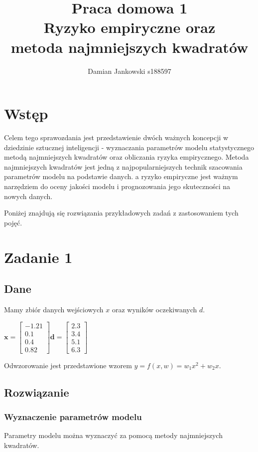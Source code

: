\documentclass{article}
\title{Praca domowa 1\\Ryzyko empiryczne oraz \\
metoda najmniejszych kwadratów}
\author{Damian Jankowski s188597}
\begin{document}
\maketitle

\section{Wstęp}
Celem tego sprawozdania jest przedstawienie dwóch ważnych 
koncepcji w dziedzinie sztucznej inteligencji - 
wyznaczania parametrów modelu statystycznego metodą 
najmniejszych kwadratów oraz obliczania ryzyka empirycznego. 
Metoda najmniejszych kwadratów jest jedną z najpopularniejszych 
technik szacowania parametrów modelu na podstawie danych. a 
ryzyko empiryczne jest ważnym narzędziem do oceny jakości 
modelu i prognozowania jego skuteczności na nowych danych. 

Poniżej znajdują się rozwiązania przykładowych zadań z
zastosowaniem tych pojęć.

\section{Zadanie 1}
\subsection{Dane}
Mamy zbiór danych wejściowych $x$ oraz wyników oczekiwanych $d$.
\begin{center}
$
\textbf{x} = 
    \begin{bmatrix}
        -1.21 \\ 0.1 \\ 0.4 \\ 0.82
    \end{bmatrix} 
\textbf{d} = 
    \begin{bmatrix}
        2.3 \\ 3.4 \\ 5.1 \\ 6.3
    \end{bmatrix} 
$
\end{center}
Odwzorowanie jest przedstawione wzorem $y = f(x, w) = w_1x^2 + w_2x$.

\subsection{Rozwiązanie}
\subsubsection{Wyznaczenie parametrów modelu}
Parametry modelu można wyznaczyć za pomocą metody najmniejszych kwadratów.
\end{document}
